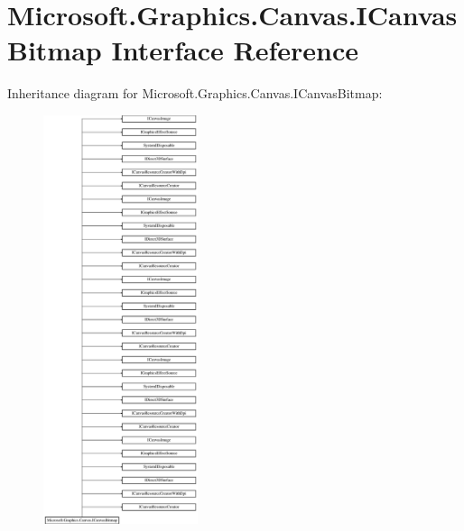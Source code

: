\hypertarget{interface_microsoft_1_1_graphics_1_1_canvas_1_1_i_canvas_bitmap}{}\section{Microsoft.\+Graphics.\+Canvas.\+I\+Canvas\+Bitmap Interface Reference}
\label{interface_microsoft_1_1_graphics_1_1_canvas_1_1_i_canvas_bitmap}
Inheritance diagram for Microsoft.\+Graphics.\+Canvas.\+I\+Canvas\+Bitmap\+:\begin{figure}[H]
\begin{center}
\leavevmode
\includegraphics[height=12.000000cm]{interface_microsoft_1_1_graphics_1_1_canvas_1_1_i_canvas_bitmap}
\end{center}
\end{figure}
